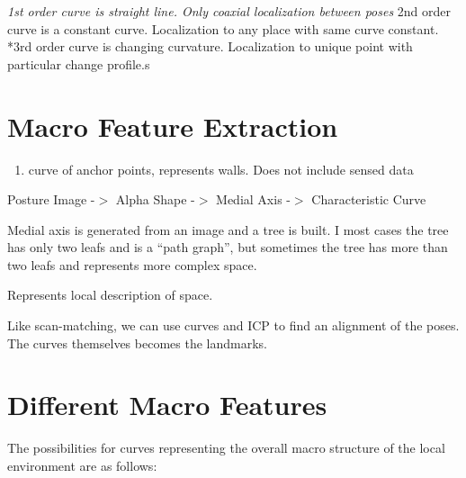\emph{1st order curve is straight line. Only coaxial localization between poses
}2nd order curve is a constant curve. Localization to any place with same curve constant.
*3rd order curve is changing curvature. Localization to unique point with particular change profile.s

\section{Macro Feature Extraction}
\label{macrofeatureextraction}

\begin{enumerate}
\item curve of anchor points, represents walls. Does not include sensed data

\end{enumerate}

Posture Image -$>$ Alpha Shape -$>$ Medial Axis -$>$ Characteristic Curve

Medial axis is generated from an image and a tree is built. I most cases the tree has only two leafs and is a “path graph”, but sometimes the tree has more than two leafs and represents more complex space.

Represents local description of space. 

Like scan-matching, we can use curves and ICP to find an alignment of the poses. The curves themselves becomes the landmarks.

\section{Different Macro Features}
\label{differentmacrofeatures}

The possibilities for curves representing the overall macro structure of the local environment are as follows:

